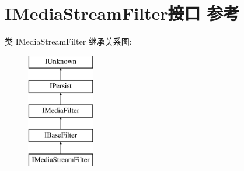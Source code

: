 \hypertarget{interface_i_media_stream_filter}{}\section{I\+Media\+Stream\+Filter接口 参考}
\label{interface_i_media_stream_filter}
类 I\+Media\+Stream\+Filter 继承关系图\+:\begin{figure}[H]
\begin{center}
\leavevmode
\includegraphics[height=5.000000cm]{interface_i_media_stream_filter}
\end{center}
\end{figure}
